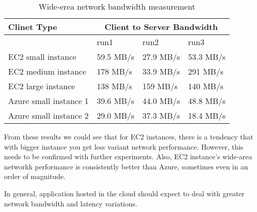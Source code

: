 \begin{table*}
\center
  \begin{tabular} {| l | l | l| l |}
\hline
Clinet Type & \multicolumn{3}{|c|}{Client to Server Bandwidth} \\
\hline
& run1 & run2 & run3 \\
\hline
EC2 small instance &  59.5 MB/s & 27.9 MB/s & 53.3 MB/s\\
EC2 medium instance & 178 MB/s & 33.9 MB/s & 291 MB/s \\
EC2 large instance & 138 MB/s & 159 MB/s & 140 MB/s \\
Azure small instance 1 & 39.6 MB/s & 44.0 MB/s & 48.8 MB/s\\
Azure small instance 2 & 29.0 MB/s & 37.3 MB/s & 18.4 MB/s\\
\hline
\end{tabular}
\caption{Wide-erea network bandwidth measurement}
\label{table:inter-band}
\end{table*}

From these results we could see that for EC2 instances, there is a tendency that with bigger instance you get less variant network performance. However, this needs to be confirmed with further experiments. Also, EC2 instance's wide-area networkk performance is consistently better than Azure, sometimes even in an order of magnitude.

In general, application hosted in the cloud should expect to deal with greater network bandwidth and latency variations.
